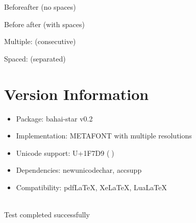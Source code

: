 \documentclass{article}
\begin{document}
Before\bahaistar{}after (no spaces)

Before \bahaistar{} after (with spaces)

Multiple: \bahaistar\bahaistar\bahaistar{} (consecutive)

Spaced: \bahaistar{} \bahaistar{} \bahaistar{} (separated)

\section{Version Information}

\begin{itemize}
\item Package: bahai-star v0.2
\item Implementation: METAFONT with multiple resolutions
\item Unicode support: U+1F7D9 (🟙)
\item Dependencies: newunicodechar, accsupp
\item Compatibility: pdfLaTeX, XeLaTeX, LuaLaTeX
\end{itemize}

\vfill

\begin{center}
\scalebox{3}{\bahaistar}\\[0.5cm]
{\footnotesize Test completed successfully}
\end{center}
\end{document}
